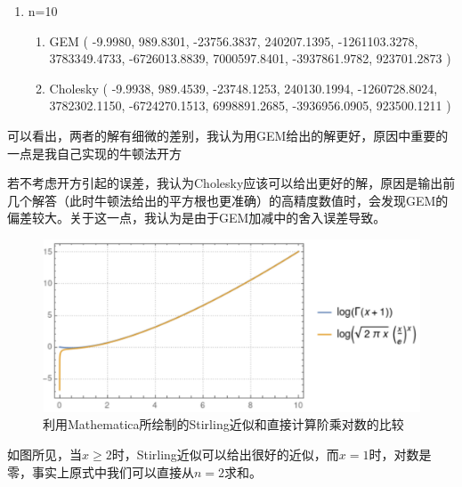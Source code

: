 \documentclass{ctexart}
\begin{document}
\begin{enumerate}
        \item n=10
        \begin{enumerate}
            \item GEM\newline
            ( -9.9980, 989.8301, -23756.3837, 240207.1395, -1261103.3278, 3783349.4733, -6726013.8839, 7000597.8401, -3937861.9782, 923701.2873 )
            \item Cholesky\newline
            ( -9.9938, 989.4539, -23748.1253, 240130.1994, -1260728.8024, 3782302.1150, -6724270.1513, 6998891.2685, -3936956.0905, 923500.1211 )
        \end{enumerate}
    \end{enumerate}
    可以看出，两者的解有细微的差别，我认为用GEM给出的解更好，原因中重要的一点是我自己实现的牛顿法开方\par
    若不考虑开方引起的误差，我认为Cholesky应该可以给出更好的解，原因是输出前几个解答（此时牛顿法给出的平方根也更准确）的高精度数值时，会发现GEM的偏差较大。关于这一点，我认为是由于GEM加减中的舍入误差导致。
\newpage{}
    \newline
   
    \begin{figure}[h]
        \centering
        \includegraphics[width=\textwidth]{Stirling.pdf}
        \caption{利用Mathematica所绘制的Stirling近似和直接计算阶乘对数的比较}
        \label{fig:1}
    \end{figure}
    如图所见，当$x\geq2$时，Stirling近似可以给出很好的近似，而$x=1$时，对数是零，事实上原式中我们可以直接从$n=2$求和。
\end{document}
